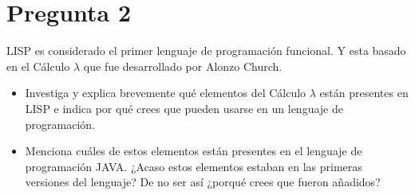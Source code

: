 \newpage
\section*{Pregunta 2}

LISP es considerado el primer lenguaje de programación funcional. Y esta basado en el Cálculo $\lambda$ que fue desarrollado por Alonzo Church.

\begin{itemize}
\item Investiga y explica brevemente qué elementos del Cálculo $\lambda$ están presentes en LISP e indica por qué crees que pueden usarse en un lenguaje de programación.


\item Menciona cuáles de estos elementos están presentes en el lenguaje de programación JAVA. ¿Acaso estos elementos estaban en las primeras versiones del lenguaje? De no ser así ¿porqué crees que fueron añadidos?\\
\end{itemize}
